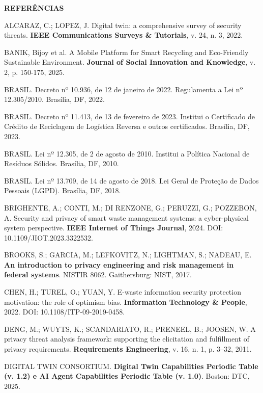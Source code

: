 \documentclass[12pt,a4paper,article,oneside,english,brazil]{abntex2}
\begin{document}
\begin{center}
\textbf{REFERÊNCIAS}
\end{center}

\begingroup
\SingleSpacing
\setlength{\parindent}{0pt}
\setlength{\parskip}{12pt}
\raggedright

ALCARAZ, C.; LOPEZ, J. Digital twin: a comprehensive survey of security threats. \textbf{IEEE Communications Surveys \& Tutorials}, v. 24, n. 3, 2022.

BANIK, Bijoy et al. A Mobile Platform for Smart Recycling and Eco-Friendly Sustainable Environment. \textbf{Journal of Social Innovation and Knowledge}, v. 2, p. 150-175, 2025.

BRASIL. Decreto nº 10.936, de 12 de janeiro de 2022. Regulamenta a Lei nº 12.305/2010. Brasília, DF, 2022.

BRASIL. Decreto nº 11.413, de 13 de fevereiro de 2023. Institui o Certificado de Crédito de Reciclagem de Logística Reversa e outros certificados. Brasília, DF, 2023.

BRASIL. Lei nº 12.305, de 2 de agosto de 2010. Institui a Política Nacional de Resíduos Sólidos. Brasília, DF, 2010.

BRASIL. Lei nº 13.709, de 14 de agosto de 2018. Lei Geral de Proteção de Dados Pessoais (LGPD). Brasília, DF, 2018.

BRIGHENTE, A.; CONTI, M.; DI RENZONE, G.; PERUZZI, G.; POZZEBON, A. Security and privacy of smart waste management systems: a cyber-physical system perspective. \textbf{IEEE Internet of Things Journal}, 2024. DOI: 10.1109/JIOT.2023.3322532.

BROOKS, S.; GARCIA, M.; LEFKOVITZ, N.; LIGHTMAN, S.; NADEAU, E. \textbf{An introduction to privacy engineering and risk management in federal systems}. NISTIR 8062. Gaithersburg: NIST, 2017.

CHEN, H.; TUREL, O.; YUAN, Y. E-waste information security protection motivation: the role of optimism bias. \textbf{Information Technology \& People}, 2022. DOI: 10.1108/ITP-09-2019-0458.

DENG, M.; WUYTS, K.; SCANDARIATO, R.; PRENEEL, B.; JOOSEN, W. A privacy threat analysis framework: supporting the elicitation and fulfillment of privacy requirements. \textbf{Requirements Engineering}, v. 16, n. 1, p. 3--32, 2011.

DIGITAL TWIN CONSORTIUM. \textbf{Digital Twin Capabilities Periodic Table (v. 1.2) e AI Agent Capabilities Periodic Table (v. 1.0)}. Boston: DTC, 2025.
\end{document}
